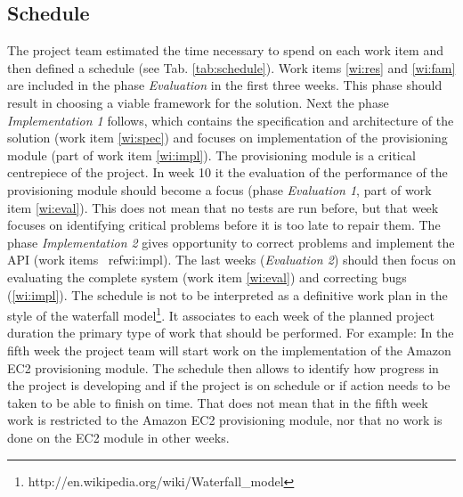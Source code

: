 \documentclass[12pt]{article}
\begin{document}
\subsection{Schedule}

The project team estimated the time necessary to spend on each work item and then defined a schedule (see Tab. \ref{tab:schedule}). Work items \ref{wi:res} and \ref{wi:fam} are included in the phase \emph{Evaluation} in the first three weeks. This phase should result in choosing a viable framework for the solution. Next the phase \emph{Implementation 1} follows, which contains the specification and architecture of the solution (work item \ref{wi:spec}) and focuses on implementation of the provisioning module (part of work item \ref{wi:impl}). The provisioning module is a critical centrepiece of the project. In week 10 it the evaluation of the performance of the provisioning module should become a focus (phase \emph{Evaluation 1}, part of work item \ref{wi:eval}). This does not mean that no tests are run before, but that week focuses on identifying critical problems before it is too late to repair them. The phase \emph{Implementation 2} gives opportunity to correct problems and implement the API (work items \
ref{wi:impl}). The last weeks (\emph{Evaluation 2}) should then focus on evaluating the complete system (work item \ref{wi:eval}) and correcting bugs (\ref{wi:impl}). The schedule is not to be interpreted as a definitive work plan in the style of the waterfall model\footnote{http://en.wikipedia.org/wiki/Waterfall\_model}. It associates to each week of the planned project duration the primary type of work that should be performed. For example: In the fifth week the project team will start work on the implementation of the Amazon EC2 provisioning module. The schedule then allows to identify how progress in the project is developing and if the project is on schedule or if action needs to be taken to be able to finish on time. That does not mean that in the fifth week work is restricted to the Amazon EC2 provisioning module, nor that no work is done on the EC2 module in other weeks.
\end{document}
